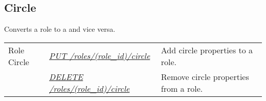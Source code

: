 \documentclass[letterpaper,10pt,english]{sphinxmanual}
\begin{document}
\subsection{Circle}
\label{\detokenize{resources/role:circle}}
Converts a role to a {\hyperref[\detokenize{resources/circle:circle}]{}} and vice versa.

\noindent\begin{tabulary}{\linewidth}{|L|L|L|}
\hline
{}\relax &\relax &\relax \\
\hline
Role Circle
&
{\hyperref[\detokenize{resources/role:put--roles-(role_id)-circle}]{\emph{PUT /roles/(role\_id)/circle}}}
&
Add circle properties to a role.
\\
\hline&
{\hyperref[\detokenize{resources/role:delete--roles-(role_id)-circle}]{\emph{DELETE /roles/(role\_id)/circle}}}
&
Remove circle properties from a role.
\\
\hline\end{tabulary}


\begin{DUlineblock}{0em}
\item[] 
\end{DUlineblock}
\end{document}
